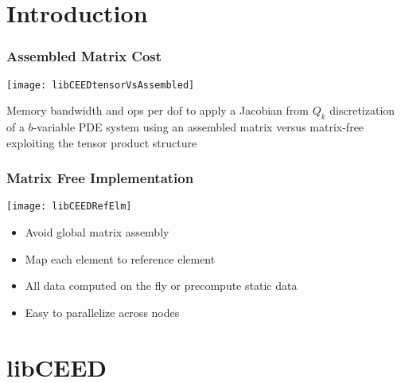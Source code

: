 \documentclass{beamer}
\begin{document}
\section{Introduction}

\begin{frame}
\begin{center}
\frametitle{Assembled Matrix Cost}

\texttt{[image: libCEEDtensorVsAssembled]}

 Memory bandwidth and ops per dof to apply a Jacobian from $Q_k$ discretization of a $b$-variable PDE system using an assembled matrix versus matrix-free exploiting the tensor product structure

\end{center}
\end{frame}


\begin{frame}
\begin{center}
\frametitle{Matrix Free Implementation}

\texttt{[image: libCEEDRefElm]}

\begin{itemize}

\item Avoid global matrix assembly

\item Map each element to reference element

\item All data computed on the fly or precompute static data

\item Easy to parallelize across nodes

\end{itemize}

\end{center}
\end{frame}

\section{libCEED}
\end{document}
